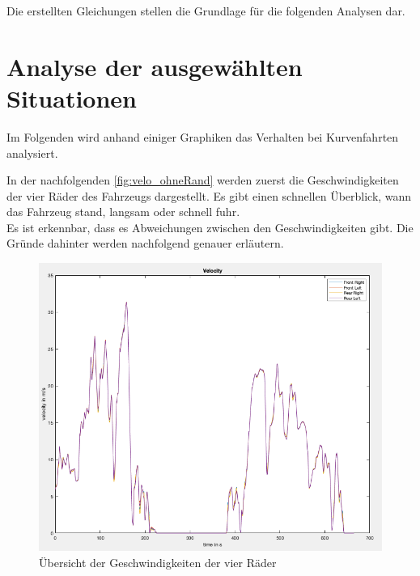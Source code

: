 Die erstellten Gleichungen stellen die Grundlage für die folgenden Analysen dar.
\newpage
\section{Analyse der ausgewählten Situationen}
	Im Folgenden wird anhand einiger Graphiken das Verhalten bei Kurvenfahrten analysiert.
	
	In der nachfolgenden \autoref{fig:velo_ohneRand} werden zuerst die Geschwindigkeiten der vier Räder des Fahrzeugs dargestellt. Es gibt einen schnellen Überblick, wann das Fahrzeug stand, langsam oder schnell fuhr. \\
	Es ist erkennbar, dass es Abweichungen zwischen den Geschwindigkeiten gibt. Die Gründe dahinter werden nachfolgend genauer erläutern.
	\begin{figure}[h!]
		\centering
		\includegraphics[width=1\linewidth]{../Graphiken/velo_ohneRand}
		\caption{Übersicht der Geschwindigkeiten der vier Räder}
		\label{fig:velo_ohneRand}
	\end{figure}
\pagebreak





